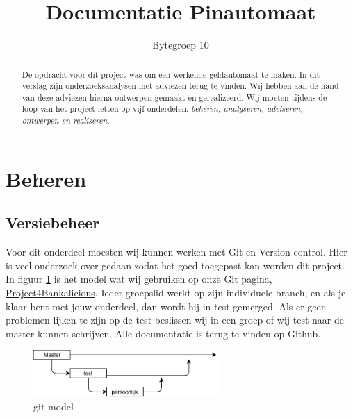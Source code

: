 \documentclass{article}
\begin{document}
\title{Documentatie Pinautomaat}
\author{Bytegroep 10}

\maketitle

\begin{abstract}

De opdracht voor dit project was om een werkende geldautomaat te maken.
In dit verslag zijn onderzoeksanalysen met adviezen terug te vinden.
Wij hebben aan de hand van deze adviezen hierna ontwerpen gemaakt en gerealizeerd.
Wij moeten tijdens de loop van het project letten op vijf onderdelen: \emph{beheren, analyseren, adviseren, ontwerpen en realiseren.}

\end{abstract}

\newpage

\tableofcontents

\newpage

\section{Beheren}

\subsection{Versiebeheer}

Voor dit onderdeel moesten wij kunnen werken met Git en Version control.
Hier is veel onderzoek over gedaan zodat het goed toegepast kan worden dit project.
In figuur \ref{fig: git model} is het model wat wij gebruiken op onze Git pagina, \href{https://github.com/Gewad/Project4Bankalicious}{Project4Bankalicious}.
Ieder groepslid werkt op zijn individuele branch, en als je klaar bent met jouw onderdeel, dan wordt hij in test gemerged.
Als er geen problemen lijken te zijn op de test beslissen wij in een groep of wij test naar de master kunnen schrijven.
Alle documentatie is terug te vinden op Github.

\begin{figure}[!h]
        \centering
        \includegraphics[height=0.7in]{git.pdf}
        \caption{git model}
        \label{fig: git model}
\end{figure}
\end{document}
